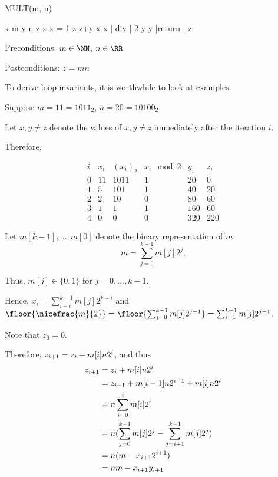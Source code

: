 \documentclass[11pt]{scrartcl}
\begin{document}
MULT(m, n)
\begin{program}
  x \gets m
  y \gets n
  z 
  \WHILE x  \DO
  \IF x  = 1
  \THEN z \gets z+y
  x \gets x | div | 2
  y \gets y 
  \FI
  \OD
  |return | z
\end{program}

Preconditions: $m\in \NN$, $n\in \RR$

Postconditions: $z=mn$

To derive loop invariants, it is worthwhile to look at examples.

Suppose $m=11 = 1011_2$, $n=20 = 10100_2$.

Let $x, y \neq z$ denote the values of $x, y\neq z$ immediately after the iteration $i$.

Therefore,

\begin{equation*}
\begin{matrix}
  i & x_i & (x_i)_2 & x_i\mod 2 & y_i & z_i \\
  0 & 11 & 1011 & 1 & 20 & 0\\
  1 & 5  & 101  & 1 & 40 & 20\\
  2 & 2  & 10   & 0 & 80 & 60\\
  3 & 1  & 1    & 1 & 160 & 60\\
  4 & 0  & 0    & 0 & 320 & 220
\end{matrix} 
\end{equation*}

Let $m[k-1], \dots, m[0]$ denote the binary representation of $m$:
\begin{equation*}
m = \sum_{j=0}^{k-1}m[j]2^j.
\end{equation*}

Thus, $m[j]\in \{0, 1\}$ for $j=0, \dots, k-1$.

Hence, $x_i = \sum_{i-i}^{k-1}m[j]2^{k-i}$ and $\floor{\nicefrac{m}{2}} = \floor{\sum_{j=0}^{k-1}m[j]2^{j-1}} = \sum_{i=1}^{k-1}m[j]2^{j-1}$.

Note that $z_0 = 0$.

Therefore, $z_{i+1} = z_i+m[i]\*n2^i$, and thus
\begin{align}
  z_{i+1} & = z_i+m[i]\*n2^i                                           \\
          & = z_{i-1} + m[i-1]\* n 2^{i-1} + m[i]n2^{i}                \\
          & = n\sum_{i=0}^{i}m[i]\*2^{i}                               \\
          & = n(\sum_{j=0}^{k-1} m[j]2^j- \sum_{j=i+1}^{k-1}m[j]2^{j}) \\
          & =n(m-x_{i+1}2^{i+1})                                           \\
          & =nm-x_{i+1}y_{i+1}
\end{align}
\end{document}
